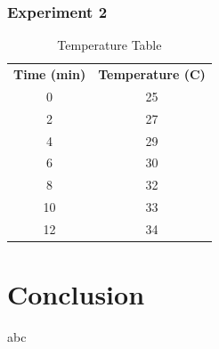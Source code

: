 \documentclass[a4paper, 12pt, english]{article}
\begin{document}
\subsubsection{Experiment 2}
\begin{table}[H]
	\caption{\label{tab:Table 3} Temperature Table}
	\centering
	\begin{tabular}{c c}
		\toprule
		\textbf{Time (min)}
		   & \textbf{Temperature (\degree C)} \\
		\cmidrule[0.4pt](r{0.125em}){1-1}%
		\cmidrule[0.4pt](lr{0.125em}){2-2}%
		0  & 25                               \\
		2  & 27                               \\
		4  & 29                               \\
		6  & 30                               \\
		8  & 32                               \\
		10 & 33                               \\
		12 & 34                               \\
		\bottomrule
	\end{tabular}
\end{table}
\section{Conclusion}
abc
\end{document}
